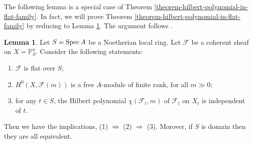 \documentclass[11pt]{amsart}
\newcommand{\Spec}{{\rm Spec \,}}
\newcommand{\sF}{{\mathcal F}}
\renewcommand{\P}{{\mathbb P}}
\theoremstyle{definition}
\newtheorem{lemma}[theorem]{Lemma}
\begin{document}
The following lemma is a special case of Theorem \ref{theorem-hilbert-polynomial-in-flat-family}. In fact, we will prove Theorem \ref{theorem-hilbert-polynomial-in-flat-family} by reducing to Lemma \ref{lemma-local-ring-hilbert-polynomial-in-flat-family}. The argument follows \cite[III, 9.8]{Hart1}.

\begin{lemma}
	\label{lemma-local-ring-hilbert-polynomial-in-flat-family}
	Let $S=\Spec A$ be a Noetherian local ring. Let $\sF$ be a coherent sheaf on $X=\P_S^n$. Consider the following statements:
	\begin{enumerate}
		\item $\sF$ is flat over $S$;
		\item $H^0(X,\sF(m))$ is a free $A$-module of finite rank, for all $m\gg 0$;
		\item for any $t\in S$, the Hilbert polynomial $\chi(\sF_t,m)$ of $\sF_t$ on $X_t$ is independent of $t$.
	\end{enumerate}
	Then we have the implications, (1) $\Leftrightarrow$ (2) $\Rightarrow$ (3). Morover, if $S$ is domain then they are all equivalent.
\end{lemma}
\end{document}
